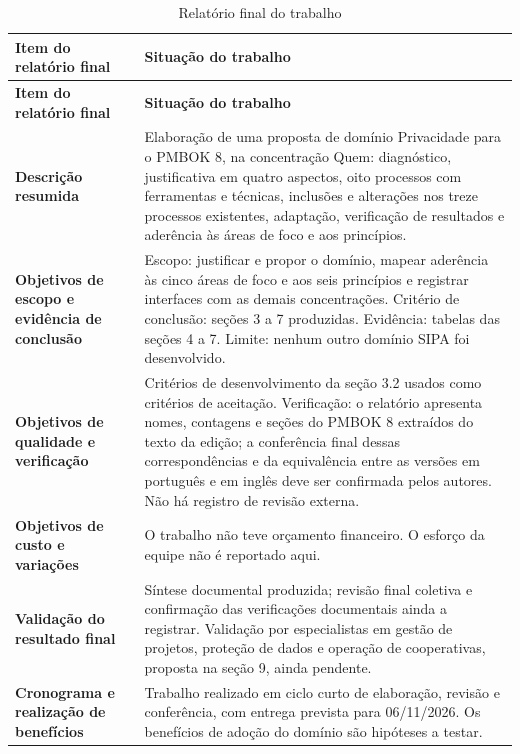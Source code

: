 \documentclass[12pt,a4paper,article,oneside,english,brazil]{abntex2}
\begin{document}
\begingroup\SingleSpacing\small
\begin{longtable}{@{}>{\raggedright\arraybackslash}p{}>{\raggedright\arraybackslash}p{}@{}}
\caption{Relatório final do trabalho}\label{tab:t12}\\
\hline
\textbf{Item do relatório final} & \textbf{Situação do trabalho}\\
\hline
\endfirsthead
\hline
\textbf{Item do relatório final} & \textbf{Situação do trabalho}\\
\hline
\endhead
\hline
\endfoot
\hline
\endlastfoot
\textbf{Descrição resumida} & Elaboração de uma proposta de domínio Privacidade para o PMBOK 8, na concentração Quem: diagnóstico, justificativa em quatro aspectos, oito processos com ferramentas e técnicas, inclusões e alterações nos treze processos existentes, adaptação, verificação de resultados e aderência às áreas de foco e aos princípios.\\[3pt]
\textbf{Objetivos de escopo e evidência de conclusão} & Escopo: justificar e propor o domínio, mapear aderência às cinco áreas de foco e aos seis princípios e registrar interfaces com as demais concentrações. Critério de conclusão: seções 3 a 7 produzidas. Evidência: tabelas das seções 4 a 7. Limite: nenhum outro domínio SIPA foi desenvolvido.\\[3pt]
\textbf{Objetivos de qualidade e verificação} & Critérios de desenvolvimento da seção 3.2 usados como critérios de aceitação. Verificação: o relatório apresenta nomes, contagens e seções do PMBOK 8 extraídos do texto da edição; a conferência final dessas correspondências e da equivalência entre as versões em português e em inglês deve ser confirmada pelos autores. Não há registro de revisão externa.\\[3pt]
\textbf{Objetivos de custo e variações} & O trabalho não teve orçamento financeiro. O esforço da equipe não é reportado aqui.\\[3pt]
\textbf{Validação do resultado final} & Síntese documental produzida; revisão final coletiva e confirmação das verificações documentais ainda a registrar. Validação por especialistas em gestão de projetos, proteção de dados e operação de cooperativas, proposta na seção 9, ainda pendente.\\[3pt]
\textbf{Cronograma e realização de benefícios} & Trabalho realizado em ciclo curto de elaboração, revisão e conferência, com entrega prevista para 06/11/2026. Os benefícios de adoção do domínio são hipóteses a testar.\\[3pt]

\end{longtable}
\end{document}
